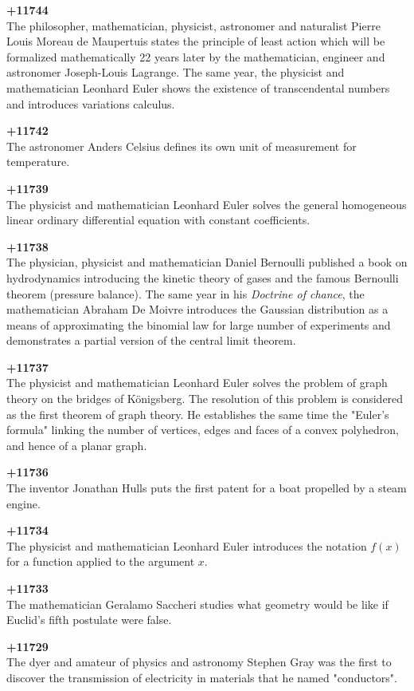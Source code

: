 \textbf{+11744}\\
The philosopher, mathematician, physicist, astronomer and naturalist Pierre Louis Moreau de Maupertuis states the principle of least action which will be formalized mathematically 22 years later by the mathematician, engineer and astronomer Joseph-Louis Lagrange. The same year, the physicist and mathematician Leonhard Euler shows the existence of transcendental numbers and introduces variations calculus.

\textbf{+11742}\\
The astronomer Anders Celsius defines its own unit of measurement for temperature.

\textbf{+11739}\\
The physicist and mathematician Leonhard Euler solves the general homogeneous linear ordinary differential equation with constant coefficients.

\textbf{+11738}\\
The physician, physicist and mathematician Daniel Bernoulli published a book on hydrodynamics introducing the kinetic theory of gases and the famous Bernoulli theorem (pressure balance). The same year in his \textit{Doctrine of chance}, the mathematician Abraham De Moivre introduces the Gaussian distribution as a means of approximating the binomial law for large number of experiments and demonstrates a partial version of the central limit theorem.

\textbf{+11737}\\
The physicist and mathematician Leonhard Euler solves the problem of graph theory on the bridges of Königsberg. The resolution of this problem is considered as the first theorem of graph theory. He establishes the same time the "Euler's formula" linking the number of vertices, edges and faces of a convex polyhedron, and hence of a planar graph.

\textbf{+11736}\\
The inventor Jonathan Hulls puts the first patent for a boat propelled by a steam engine.

\textbf{+11734}\\
The physicist and mathematician Leonhard Euler introduces the notation $f(x)$ for a function applied to the argument $x$.

\textbf{+11733}\\
The mathematician Geralamo Saccheri studies what geometry would be like if Euclid's fifth postulate were false.

\textbf{+11729}\\
The dyer and amateur of physics and astronomy Stephen Gray was the first to discover the transmission of electricity in materials that he named "conductors".

